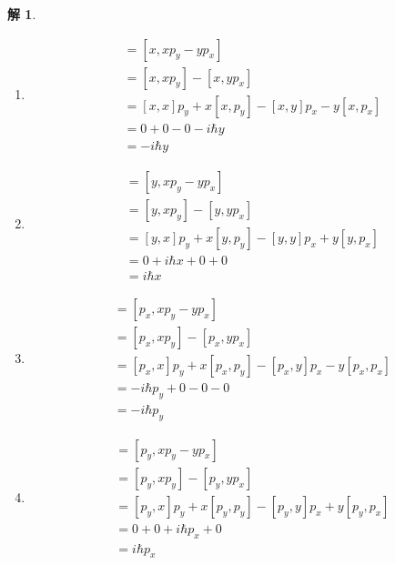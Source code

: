 \documentclass{article}
\newtheorem{solution}{解}
\begin{document}
\begin{solution}
    \begin{enumerate}
        \item[(a)] 
        \begin{align*}
            [x,L_z]&=[x,xp_y-yp_x]\\
            &=[x,xp_y]-[x,yp_x]\\
            &=[x,x]p_y+x[x,p_y]-[x,y]p_x-y[x,p_x]\\
            &=0+0-0-i\hbar y\\
            &=-i\hbar y
        \end{align*}
        \item[(b)]
        \begin{align*}
            [y,L_z]&=[y,xp_y-yp_x]\\
            &=[y,xp_y]-[y,yp_x]\\
            &=[y,x]p_y+x[y,p_y]-[y,y]p_x+y[y,p_x]\\
            &=0+i\hbar x+0+0\\
            &=i\hbar x
        \end{align*}
        \item[(c)]
        \begin{align*}
            [p_x,L_z]&=[p_x,xp_y-yp_x]\\
            &=[p_x,xp_y]-[p_x,yp_x]\\
            &=[p_x,x]p_y+x[p_x,p_y]-[p_x,y]p_x-y[p_x,p_x]\\
            &=-i\hbar p_y+0-0-0\\
            &=-i\hbar p_y
        \end{align*}
        \item[(d)]
        \begin{align*}
            [p_y,L_z]&=[p_y,xp_y-yp_x]\\
            &=[p_y,xp_y]-[p_y,yp_x]\\
            &=[p_y,x]p_y+x[p_y,p_y]-[p_y,y]p_x+y[p_y,p_x]\\
            &=0+0+i\hbar p_x+0\\
            &=i\hbar p_x
        \end{align*}
    \end{enumerate}
\end{solution}
\end{document}
